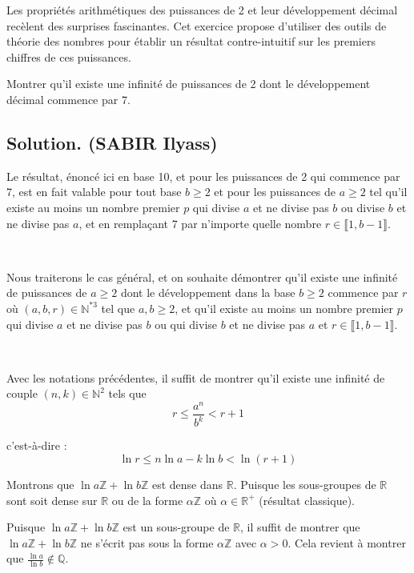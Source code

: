 Les propri{\'e}t{\'e}s arithm{\'e}tiques des puissances de 2 et leur
d{\'e}veloppement d{\'e}cimal rec{\`e}lent des surprises fascinantes. Cet
exercice propose d'utiliser des outils de th{\'e}orie des nombres pour
{\'e}tablir un r{\'e}sultat contre-intuitif sur les premiers chiffres de ces
puissances.
\begin{exercise}
Montrer qu'il existe une infinit{\'e} de puissances de 2 dont le
d{\'e}veloppement d{\'e}cimal commence par 7.
\end{exercise}

\subsection*{Solution. (SABIR Ilyass)}

Le r{\'e}sultat, {\'e}nonc{\'e} ici en base 10, et pour les puissances de 2
qui commence par 7, est en fait valable pour tout base $b \geq 2$ et pour les
puissances de $a \geq 2$ tel qu'il existe au moins un nombre premier $p$ qui
divise $a$ et ne divise pas $b$ ou divise $b$ et ne divise pas $a$, et en
rempla{\c c}ant 7 par n'importe quelle nombre $r \in \llbracket 1, b - 1
\rrbracket$.

\

Nous traiterons le cas g{\'e}n{\'e}ral, et on souhaite d{\'e}montrer qu'il
existe une infinit{\'e} de puissances de $a \geq 2$ dont le d{\'e}veloppement
dans la base $b \geq 2$ commence par $r$ o{\`u} $(a, b, r) \in
\mathbb{N}^{\ast 3}$ tel que $a, b \geq 2$, et qu'il existe au moins un nombre
premier $p$ qui divise $a$ et ne divise pas $b$ ou qui divise $b$ et ne divise
pas $a$ et $r \in \llbracket 1, b - 1 \rrbracket$.

\

Avec les notations pr{\'e}c{\'e}dentes, il suffit de montrer qu'il existe une
infinit{\'e} de couple $(n, k) \in \mathbb{N}^2$ tels que
\[ r \leq \frac{a^n}{b^k} < r + 1 \]


c'est-{\`a}-dire :
\[ \ln r \leq n \ln a - k \ln b < \ln (r + 1) \]


Montrons que $\ln a\mathbb{Z}+ \ln b\mathbb{Z}$ est dense dans $\mathbb{R}$.
Puisque les sous-groupes de $\mathbb{R}$ sont soit dense sur $\mathbb{R}$ ou
de la forme $\alpha \mathbb{Z}$ o{\`u} $\alpha \in \mathbb{R}^+$ (r{\'e}sultat
classique).

Puisque $\ln a\mathbb{Z}+ \ln b\mathbb{Z}$ est un sous-groupe de $\mathbb{R}$,
il suffit de montrer que $\ln a\mathbb{Z}+ \ln b\mathbb{Z}$ ne s'{\'e}crit pas
sous la forme $\alpha \mathbb{Z}$ avec $\alpha > 0$. Cela revient {\`a}
montrer que $\frac{\ln a}{\ln b} \nin \mathbb{Q}$.

